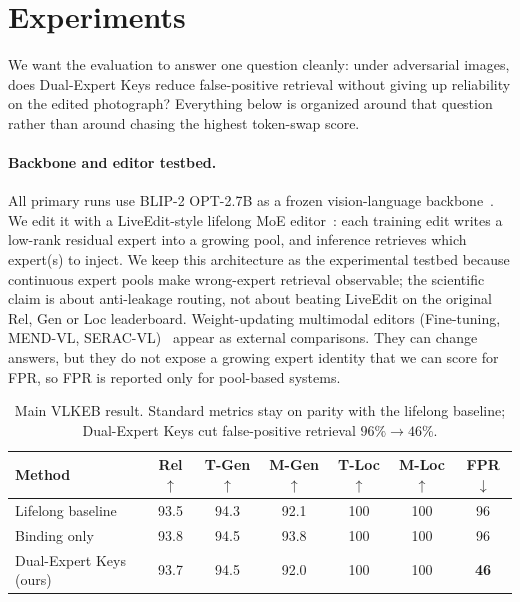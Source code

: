 \documentclass[letterpaper]{article} %
\begin{document}
\section{Experiments}
\label{sec:experiments}

We want the evaluation to answer one question cleanly: under adversarial images, does Dual-Expert Keys reduce false-positive retrieval without giving up reliability on the edited photograph?
Everything below is organized around that question rather than around chasing the highest token-swap score.

\paragraph{Backbone and editor testbed.}
All primary runs use BLIP-2 OPT-2.7B as a frozen vision-language backbone~\cite{li2023blip2}.
We edit it with a LiveEdit-style lifelong MoE editor~\cite{chen2025liveedit}: each training edit writes a low-rank residual expert into a growing pool, and inference retrieves which expert(s) to inject.
We keep this architecture as the experimental testbed because continuous expert pools make wrong-expert retrieval observable; the scientific claim is about anti-leakage routing, not about beating LiveEdit on the original Rel, Gen or Loc leaderboard.
Weight-updating multimodal editors (Fine-tuning, MEND-VL, SERAC-VL)~\cite{Mitchell2021FastME,mitchell2022serac,cheng2023mmedit} appear as external comparisons.
They can change answers, but they do not expose a growing expert identity that we can score for FPR, so FPR is reported only for pool-based systems.
\begin{table}[!ht]
\centering
\small
\setlength{\tabcolsep}{6pt}
\begin{tabular}{lcccccc}
\toprule
Method & Rel$\uparrow$ & T-Gen$\uparrow$ & M-Gen$\uparrow$ & T-Loc$\uparrow$ & M-Loc$\uparrow$ & FPR$\downarrow$ \\
\midrule
Lifelong baseline & 93.5 & 94.3 & 92.1 & 100 & 100 & 96 \\
Binding only & 93.8 & 94.5 & 93.8 & 100 & 100 & 96 \\
Dual-Expert Keys (ours) & 93.7 & 94.5 & 92.0 & 100 & 100 & \textbf{46} \\
\bottomrule
\end{tabular}
\caption{Main VLKEB result.
Standard metrics stay on parity with the lifelong baseline; Dual-Expert Keys cut false-positive retrieval $96\%\!\rightarrow\!46\%$.}
\label{tab:standard-vlkeb}
\end{table}
\end{document}

